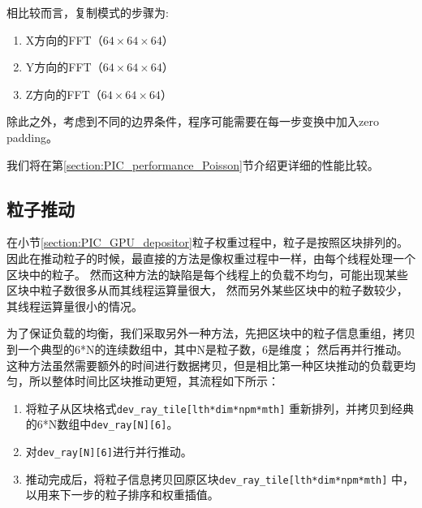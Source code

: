 相比较而言，复制模式的步骤为:
\begin{enumerate}
  \item X方向的FFT（$64 \times 64 \times 64$）
  \item Y方向的FFT（$64 \times 64 \times 64$）
  \item Z方向的FFT（$64 \times 64 \times 64$）
\end{enumerate}

除此之外，考虑到不同的边界条件，程序可能需要在每一步变换中加入zero padding。

我们将在第\ref{section:PIC_performance_Poisson}节介绍更详细的性能比较。


\subsection{粒子推动}
在小节\ref{section:PIC_GPU_depositor}粒子权重过程中，粒子是按照区块排列的。
因此在推动粒子的时候，最直接的方法是像权重过程中一样，由每个线程处理一个区块中的粒子。
然而这种方法的缺陷是每个线程上的负载不均匀，可能出现某些区块中粒子数很多从而其线程运算量很大，
然而另外某些区块中的粒子数较少，其线程运算量很小的情况。

为了保证负载的均衡，我们采取另外一种方法，先把区块中的粒子信息重组，拷贝到一个典型的6*N的连续数组中，其中N是粒子数，6是维度；
然后再并行推动。这种方法虽然需要额外的时间进行数据拷贝，但是相比第一种区块推动的负载更均匀，所以整体时间比区块推动更短，其流程如下所示：
\begin{enumerate}
  \item 将粒子从区块格式\verb"dev_ray_tile[lth*dim*npm*mth]" 重新排列，并拷贝到经典的6*N数组中\verb"dev_ray[N][6]"。
  \item 对\verb"dev_ray[N][6]"进行并行推动。
  \item 推动完成后，将粒子信息拷贝回原区块\verb"dev_ray_tile[lth*dim*npm*mth]" 中，以用来下一步的粒子排序和权重插值。
\end{enumerate}



